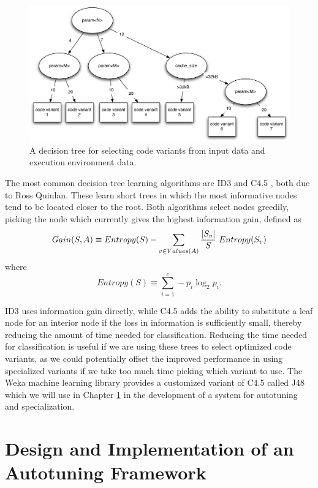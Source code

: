 \documentclass[msthesis,justified,copyright,final,numbers,sort&compress,
gsmodern,amstex,natbib]{uothesis}
\begin{document}
\begin{figure}[tbp]
\centering
\includegraphics[width=\textwidth]{dectree.pdf}
\caption{A decision tree for selecting code variants from input data and execution environment data.}
\label{fig:dectree}
\end{figure}

The most common decision tree learning algorithms are ID3 \cite{id3} and C4.5 \cite{c45}, both due to Ross Quinlan. These learn short trees in which the most informative nodes tend to be located closer to the root. Both algorithms select nodes greedily, picking the node which currently gives the highest information gain, defined as $$Gain(S,A) \equiv Entropy(S) - \sum\limits_{v \in Values(A)} {{\left|S_v\right|}\over{S}}\ Entropy(S_v)$$ where $$Entropy(S) \equiv \sum\limits_{i=1}^c -p_i\log_2 p_i\mathrm{.}$$

ID3 uses information gain directly, while C4.5 adds the ability to substitute a leaf node for an interior node if the loss in information is sufficiently small, thereby reducing the amount of time needed for classification. Reducing the time needed for classification is useful if we are using these trees to select optimized code variants, as we could potentially offset the improved performance in using specialized variants if we take too much time picking which variant to use. The Weka machine learning library \cite{weka} provides a customized variant of C4.5 called J48 which we will use in Chapter \ref{design} in the development of a system for autotuning and specialization.



\chapter[Design and Implementation of an Autotuning \\* Framework]{Design and Implementation of an Autotuning Framework}
\label{design}
\end{document}
